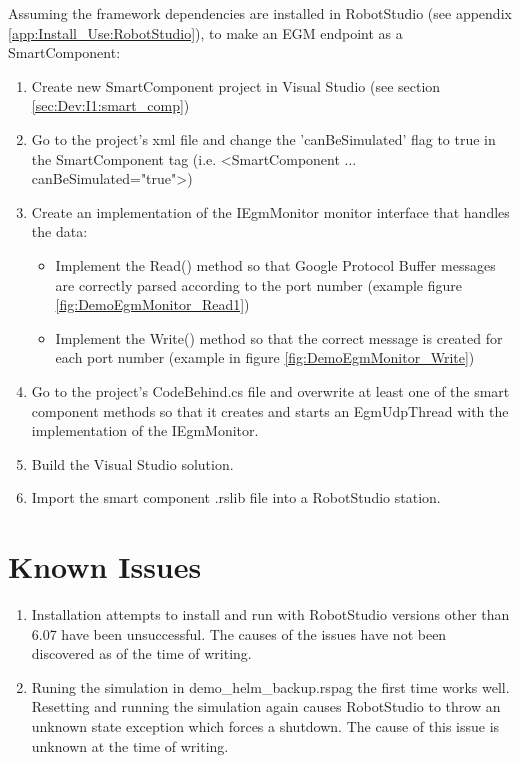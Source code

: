 \documentclass{cslthse-msc}
\begin{document}
\begin{appendices}
Assuming the framework dependencies are installed in RobotStudio (see appendix \ref{app:Install_Use:RobotStudio}), to make an EGM endpoint as a SmartComponent:
\begin{enumerate}
    \item Create new SmartComponent project in Visual Studio (see section \ref{sec:Dev:I1:smart_comp})
    \item Go to the project's xml file and change the 'canBeSimulated' flag to true in the SmartComponent tag (i.e. <SmartComponent ... canBeSimulated="true">)
    \item Create an implementation of the IEgmMonitor monitor interface that handles the data:
        \begin{itemize}
            \item Implement the Read() method so that Google Protocol Buffer messages are correctly parsed according to the port number (example figure \ref{fig:DemoEgmMonitor_Read1})
            \item Implement the Write() method so that the correct message is created for each port number (example in figure \ref{fig:DemoEgmMonitor_Write})
        \end{itemize}
    \item Go to the project's CodeBehind.cs file and overwrite at least one of the smart component methods so that it creates and starts an EgmUdpThread with the implementation of the IEgmMonitor. 
    \item Build the Visual Studio solution.
    \item  Import the smart component .rslib file into a RobotStudio station.
\end{enumerate}

\section{Known Issues}
\begin{enumerate}
    \item Installation attempts to install and run with RobotStudio versions other than 6.07 have been unsuccessful. The causes of the issues have not been discovered as of the time of writing.  
    \item Runing the simulation in demo\_helm\_backup.rspag the first time works well. Resetting and running the simulation again causes RobotStudio to throw an unknown state exception which forces a shutdown. The cause of this issue is unknown at the time of writing. 
\end{enumerate}


\end{appendices}
\end{document}
